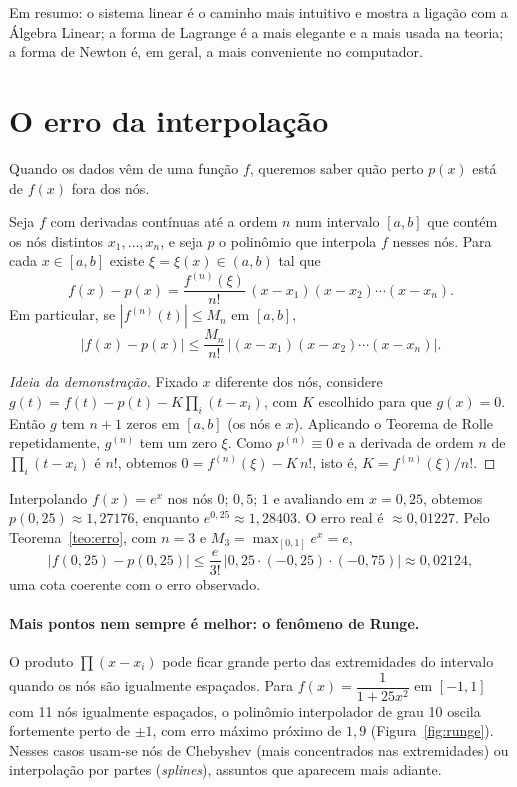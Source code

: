 Em resumo: o sistema linear é o caminho mais intuitivo e mostra a ligação com a Álgebra
Linear; a forma de Lagrange é a mais elegante e a mais usada na teoria; a forma de Newton é,
em geral, a mais conveniente no computador.

\section{O erro da interpolação}

Quando os dados vêm de uma função $f$, queremos saber quão perto $p(x)$ está de $f(x)$ fora
dos nós.

\begin{teorema}\label{teo:erro}
Seja $f$ com derivadas contínuas até a ordem $n$ num intervalo $[a,b]$ que contém os nós
distintos $x_1,\dots,x_n$, e seja $p$ o polinômio que interpola $f$ nesses nós. Para cada
$x\in[a,b]$ existe $\xi=\xi(x)\in(a,b)$ tal que
\[
f(x)-p(x)=\frac{f^{(n)}(\xi)}{n!}\,(x-x_1)(x-x_2)\cdots(x-x_n).
\]
Em particular, se $|f^{(n)}(t)|\le M_n$ em $[a,b]$,
\[
|f(x)-p(x)|\le\frac{M_n}{n!}\,\bigl|(x-x_1)(x-x_2)\cdots(x-x_n)\bigr|.
\]
\end{teorema}

\begin{proof}[Ideia da demonstração]
Fixado $x$ diferente dos nós, considere
$g(t)=f(t)-p(t)-K\prod_{i}(t-x_i)$, com $K$ escolhido para que $g(x)=0$. Então $g$ tem
$n+1$ zeros em $[a,b]$ (os nós e $x$). Aplicando o Teorema de Rolle repetidamente,
$g^{(n)}$ tem um zero $\xi$. Como $p^{(n)}\equiv0$ e a derivada de ordem $n$ de
$\prod_i(t-x_i)$ é $n!$, obtemos $0=f^{(n)}(\xi)-K\,n!$, isto é, $K=f^{(n)}(\xi)/n!$.
\end{proof}

\begin{exemplo}
Interpolando $f(x)=e^x$ nos nós $0$; $0{,}5$; $1$ e avaliando em $x=0{,}25$, obtemos
$p(0{,}25)\approx1{,}27176$, enquanto $e^{0{,}25}\approx1{,}28403$. O erro real é
$\approx0{,}01227$. Pelo Teorema~\ref{teo:erro}, com $n=3$ e $M_3=\max_{[0,1]}e^x=e$,
\[
|f(0{,}25)-p(0{,}25)|\le\frac{e}{3!}\,|0{,}25\cdot(-0{,}25)\cdot(-0{,}75)|\approx0{,}02124,
\]
uma cota coerente com o erro observado.
\end{exemplo}

\paragraph{Mais pontos nem sempre é melhor: o fenômeno de Runge.} O produto
$\prod(x-x_i)$ pode ficar grande perto das extremidades do intervalo quando os nós são
igualmente espaçados. Para $f(x)=\dfrac{1}{1+25x^2}$ em $[-1,1]$ com 11 nós igualmente
espaçados, o polinômio interpolador de grau 10 oscila fortemente perto de $\pm1$, com erro
máximo próximo de $1{,}9$ (Figura~\ref{fig:runge}). Nesses casos usam-se nós de Chebyshev
(mais concentrados nas extremidades) ou interpolação por partes (\emph{splines}), assuntos
que aparecem mais adiante.

